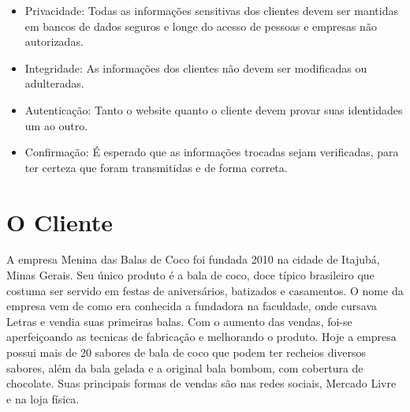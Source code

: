 \begin{itemize}
  \item Privacidade: Todas as informações sensitivas dos clientes devem ser mantidas em bancos de dados seguros e longe do acesso de pessoas e empresas não autorizadas.
  \item Integridade: As informações dos clientes não devem ser modificadas ou adulteradas.
  \item Autenticação: Tanto o website quanto o cliente devem provar suas identidades um ao outro.
  \item Confirmação: É esperado que as informações trocadas sejam verificadas, para ter certeza que foram transmitidas e de forma correta.
\end{itemize}

\section{O Cliente}

A empresa Menina das Balas de Coco foi fundada 2010 na cidade de Itajubá, Minas Gerais. Seu único produto é a bala de coco, doce típico brasileiro que costuma ser servido em festas de aniversários, batizados e casamentos. O nome da empresa vem de como era conhecida a fundadora na faculdade, onde cursava Letras e vendia suas primeiras balas. Com o aumento das vendas, foi-se aperfeiçoando as tecnicas de fabricação e melhorando o produto. Hoje a empresa possui mais de 20 sabores de bala de coco que podem ter recheios diversos sabores, além da bala gelada e a original bala bombom, com cobertura de chocolate. Suas principais formas de vendas são nas redes sociais, Mercado Livre e na loja física.

